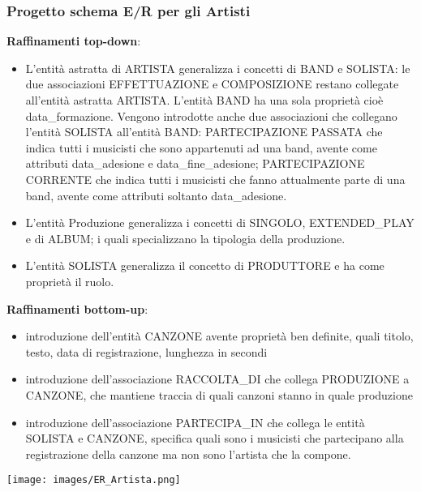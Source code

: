 \documentclass{article}
\begin{document}
\subsubsection{Progetto schema E/R per gli Artisti}
\begin{center}
    
\end{center}
\textbf{Raffinamenti top-down}:
\begin{itemize}
    \item L'entità astratta di ARTISTA generalizza i concetti di BAND e SOLISTA: le due associazioni EFFETTUAZIONE e COMPOSIZIONE restano collegate all'entità astratta ARTISTA. L'entità BAND ha una sola proprietà cioè data\_formazione. Vengono introdotte anche due associazioni che collegano l'entità SOLISTA all'entità BAND: PARTECIPAZIONE PASSATA che indica tutti i musicisti che sono appartenuti ad una band, avente come attributi data\_adesione e data\_fine\_adesione; PARTECIPAZIONE CORRENTE che indica tutti i musicisti che fanno attualmente parte di una band, avente come attributi soltanto data\_adesione.
    \item L'entità Produzione generalizza i concetti di SINGOLO, EXTENDED\_PLAY e di ALBUM; i quali specializzano la tipologia della produzione.
    \item L'entità SOLISTA generalizza il concetto di PRODUTTORE e ha come proprietà il ruolo.
\end{itemize}
\textbf{Raffinamenti bottom-up}:
\begin{itemize}
    \item introduzione dell'entità CANZONE avente proprietà ben definite, quali titolo, testo, data di registrazione, lunghezza in secondi
    \item introduzione dell'associazione RACCOLTA\_DI che collega PRODUZIONE a CANZONE, che mantiene traccia di quali canzoni stanno in quale produzione
    \item introduzione dell'associazione PARTECIPA\_IN che collega le entità SOLISTA e CANZONE, specifica quali sono i musicisti che partecipano alla registrazione della canzone ma non sono l'artista che la compone.
\end{itemize}

\begin{center}
    \texttt{[image: images/ER\_Artista.png]}
\end{center}
\end{document}
